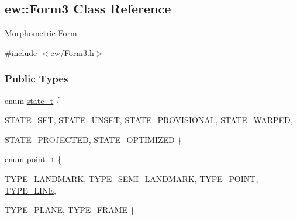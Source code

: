 \hypertarget{classew_1_1Form3}{
\subsection{ew::Form3 Class Reference}
\label{classew_1_1Form3}
}


Morphometric Form.  




{\ttfamily \#include $<$ew/Form3.h$>$}

\subsubsection*{Public Types}
\begin{DoxyCompactItemize}
\item 
enum \hyperlink{classew_1_1Form3_a0fb1f90f8936fc647de8bf351aa0f725}{state\_\-t} \{ \par
\hyperlink{classew_1_1Form3_a0fb1f90f8936fc647de8bf351aa0f725acce88d69a207a761cb9d267bf36a4882}{STATE\_\-SET}, 
\hyperlink{classew_1_1Form3_a0fb1f90f8936fc647de8bf351aa0f725afc4f92640e5a0ba7ba025265300df60d}{STATE\_\-UNSET}, 
\hyperlink{classew_1_1Form3_a0fb1f90f8936fc647de8bf351aa0f725a7c68944bfd7af307bf1097e3f6a98647}{STATE\_\-PROVISIONAL}, 
\hyperlink{classew_1_1Form3_a0fb1f90f8936fc647de8bf351aa0f725a929401893c671bbb4be2e50cba63949e}{STATE\_\-WARPED}, 
\par
\hyperlink{classew_1_1Form3_a0fb1f90f8936fc647de8bf351aa0f725accd0d7c17a3c1219c2c13d0d25af018c}{STATE\_\-PROJECTED}, 
\hyperlink{classew_1_1Form3_a0fb1f90f8936fc647de8bf351aa0f725a845f0d997e74de0ec5a055f923ef6975}{STATE\_\-OPTIMIZED}
 \}
\item 
enum \hyperlink{classew_1_1Form3_abfa10aaae60c2888a7e201cd8fd45733}{point\_\-t} \{ \par
\hyperlink{classew_1_1Form3_abfa10aaae60c2888a7e201cd8fd45733aafd3312606d8242fd8a650020fb682c5}{TYPE\_\-LANDMARK}, 
\hyperlink{classew_1_1Form3_abfa10aaae60c2888a7e201cd8fd45733a2ebb795c7e887f4d69bae678ad490df6}{TYPE\_\-SEMI\_\-LANDMARK}, 
\hyperlink{classew_1_1Form3_abfa10aaae60c2888a7e201cd8fd45733a63adf7483ccd80afe7d295aecf1508c0}{TYPE\_\-POINT}, 
\hyperlink{classew_1_1Form3_abfa10aaae60c2888a7e201cd8fd45733af4a3d6f8994ebe1d4ee511fdf4ba6da0}{TYPE\_\-LINE}, 
\par
\hyperlink{classew_1_1Form3_abfa10aaae60c2888a7e201cd8fd45733a7d720e976a12e6140d954e3dfbcfeb2f}{TYPE\_\-PLANE}, 
\hyperlink{classew_1_1Form3_abfa10aaae60c2888a7e201cd8fd45733a03680acbf4911849a3fbdfa9c310f787}{TYPE\_\-FRAME}
 \}
\end{DoxyCompactItemize}
